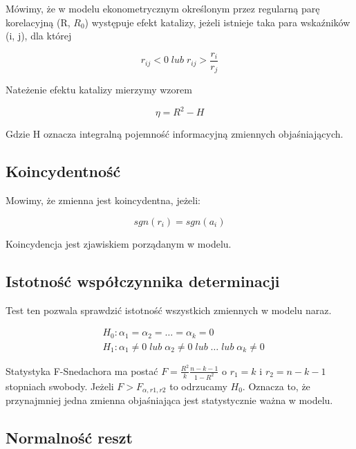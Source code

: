 Mówimy, że w modelu ekonometrycznym określonym przez regularną
parę korelacyjną (R, \(R_0\)) występuje efekt katalizy, jeżeli istnieje taka
para wskaźników (i, j), dla której

\begin{equation}
    r_{ij} < 0 \; lub \; r_{ij}  > \frac{r_i}{r_j}
\end{equation}

Nateżenie efektu katalizy mierzymy wzorem

\[ \eta = R^2 - H \]

Gdzie H oznacza integralną pojemność informacyjną zmiennych objaśniających.

\subsection{Koincydentność}\label{subsec:koincydentność}

Mowimy, że zmienna jest koincydentna, jeżeli:

\begin{equation}
    sgn(r_i) = sgn(a_i)
\end{equation}

Koincydencja jest zjawiskiem porządanym w modelu.

\subsection{Istotność współczynnika determinacji}\label{subsec:istotność-współczynnika-determinacji}

Test ten pozwala sprawdzić istotność wszystkich zmiennych w modelu naraz.

\begin{equation}
    \begin{split}
        &H_0: \alpha_1 = \alpha_2 = \dots = \alpha_k = 0 \\
        &H_1: \alpha_1 \ne 0 \; lub \; \alpha_2 \ne 0 \; lub \; \dots \; lub \; \alpha_k \ne 0
    \end{split}
\end{equation}

Statystyka F-Snedachora ma postać \(F = \frac{R^2}{k} \frac{n-k-1}{1-R^2}\) o \(r_1 = k\) i \(r_2 = n-k-1\) stopniach swobody.
Jeżeli \(F > F_{\alpha,r1,r2} \) to odrzucamy \(H_0\).
Oznacza to, że przynajmniej jedna zmienna objaśniająca jest statystycznie ważna w modelu.

\subsection{Normalność reszt}\label{subsec:normalność-reszt}

